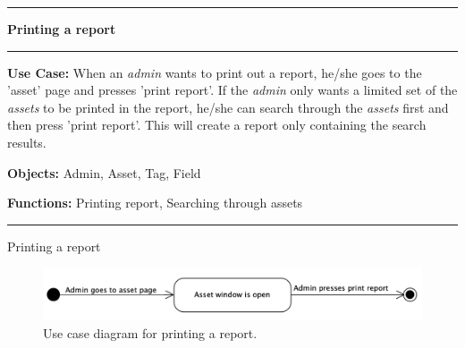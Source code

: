 \begin{use_case}[H]
    \hrule
    \vskip 0.3cm
    \Large
    \begin{center}
    
        \textbf{Printing a report}
        
    \end{center}
    \vskip 0.1cm
    \hrule
    \vskip 0.2cm
    \normalsize
    
    \textbf{Use Case:} When an \textit{admin} wants to print out a report, he/she goes to the 'asset' page and presses 'print report'. If the \textit{admin} only wants a limited set of the \textit{assets} to be printed in the report, he/she can search through the \textit{assets} first and then press 'print report'. This will create a report only containing the search results.
    
    \vskip 0.2cm
    
    \textbf{Objects:} Admin, Asset, Tag, Field
    
    \vskip 0.2cm
    
    \textbf{Functions:} Printing report, Searching through assets
    
    \vskip 0.4cm
    \hrule
    \vskip 0.2cm
    \caption{Printing a report} \label{use_case:printing_a_report}
\end{use_case}

\begin{figure}[H]
    \centering
    \includegraphics[width=1.0\textwidth]{figures/PrintReport.png}
    \caption{Use case diagram for printing a report.}
    \label{fig:UseCasePrintReport}
\end{figure}


